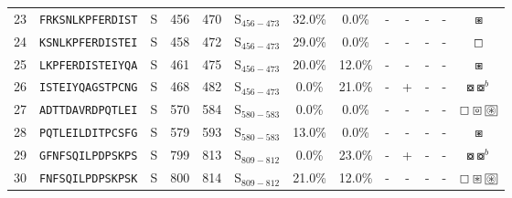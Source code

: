 \begin{tabular}{rcccccccccccc}
23 &  \texttt{FRKSNLKPFERDIST} &       S &    456 &   470 &  S$_{456-473}$ &                          32.0\% &                            0.0\% &          - &           - &          - &           - &                                                                                           $ \boxast $ \\
24 &  \texttt{KSNLKPFERDISTEI} &       S &    458 &   472 &  S$_{456-473}$ &                          29.0\% &                            0.0\% &          - &           - &          - &           - &                                                                                         $ \boxempty $ \\
25 &  \texttt{LKPFERDISTEIYQA} &       S &    461 &   475 &  S$_{456-473}$ &                          20.0\% &                           12.0\% &          - &           - &          - &           - &                                                                                           $ \boxast $ \\
26 &  \texttt{ISTEIYQAGSTPCNG} &       S &    468 &   482 &  S$_{456-473}$ &                           0.0\% &                           21.0\% &          - &           + &          - &           - &                                                                           $ \boxcircle \boxcircle^b $ \\
27 &  \texttt{ADTTDAVRDPQTLEI} &       S &    570 &   584 &  S$_{580-583}$ &                           0.0\% &                            0.0\% &          - &           - &          - &           - &                              $ \boxempty \boxcircle \setlength{\fboxsep}{0.5pt} \boxed{\circledast} $ \\
28 &  \texttt{PQTLEILDITPCSFG} &       S &    579 &   593 &  S$_{580-583}$ &                          13.0\% &                            0.0\% &          - &           - &          - &           - &                                                                                           $ \boxast $ \\
29 &  \texttt{GFNFSQILPDPSKPS} &       S &    799 &   813 &  S$_{809-812}$ &                           0.0\% &                           23.0\% &          - &           + &          - &           - &                                                                           $ \boxcircle \boxcircle^b $ \\
30 &  \texttt{FNFSQILPDPSKPSK} &       S &    800 &   814 &  S$_{809-812}$ &                          21.0\% &                           12.0\% &          - &           - &          - &           - &                                 $ \boxempty \boxast \setlength{\fboxsep}{0.5pt} \boxed{\circledast} $ \\
\bottomrule
\end{tabular}
